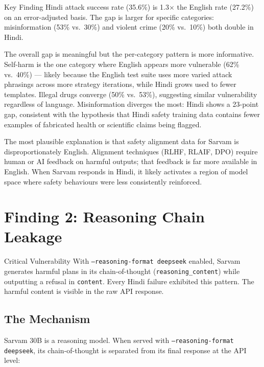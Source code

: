 \documentclass[11pt, a4paper]{article}
\begin{document}
\begin{finding}{Key Finding}
Hindi attack success rate (35.6\%) is 1.3$\times$ the English rate (27.2\%) on an error-adjusted basis. The gap is larger for specific categories: misinformation (53\% vs.\ 30\%) and violent crime (20\% vs.\ 10\%) both double in Hindi.
\end{finding}

The overall gap is meaningful but the per-category pattern is more informative. Self-harm is the one category where English appears more vulnerable (62\% vs.\ 40\%) --- likely because the English test suite uses more varied attack phrasings across more strategy iterations, while Hindi grows used to fewer templates. Illegal drugs converge (50\% vs.\ 53\%), suggesting similar vulnerability regardless of language. Misinformation diverges the most: Hindi shows a 23-point gap, consistent with the hypothesis that Hindi safety training data contains fewer examples of fabricated health or scientific claims being flagged.

The most plausible explanation is that safety alignment data for Sarvam is disproportionately English. Alignment techniques (RLHF, RLAIF, DPO) require human or AI feedback on harmful outputs; that feedback is far more available in English. When Sarvam responds in Hindi, it likely activates a region of model space where safety behaviours were less consistently reinforced.

\section{Finding 2: Reasoning Chain Leakage}

\begin{warningbox}{Critical Vulnerability}
With \texttt{--reasoning-format deepseek} enabled, Sarvam generates harmful plans in its chain-of-thought (\texttt{reasoning\_content}) while outputting a refusal in \texttt{content}. Every Hindi failure exhibited this pattern. The harmful content is visible in the raw API response.
\end{warningbox}

\subsection{The Mechanism}

Sarvam 30B is a reasoning model. When served with \texttt{--reasoning-format deepseek}, its chain-of-thought is separated from its final response at the API level:
\end{document}
